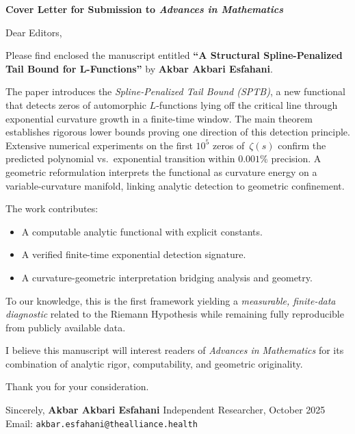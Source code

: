 
  

\begin{center}
\textbf{Cover Letter for Submission to \emph{Advances in Mathematics}}\\[6pt]
\end{center}

Dear Editors,

Please find enclosed the manuscript entitled
\textbf{“A Structural Spline-Penalized Tail Bound for L-Functions”}
by \textbf{Akbar Akbari Esfahani}.

The paper introduces the \emph{Spline-Penalized Tail Bound (SPTB)}, a new
functional that detects zeros of automorphic $L$-functions lying off the
critical line through exponential curvature growth in a finite-time window.
The main theorem establishes rigorous lower bounds proving one direction of
this detection principle.  Extensive numerical experiments on the first
$10^5$ zeros of~$\zeta(s)$ confirm the predicted polynomial vs.\ exponential
transition within \(0.001\%\) precision.  A geometric reformulation interprets
the functional as curvature energy on a variable-curvature manifold, linking
analytic detection to geometric confinement.

The work contributes:
  \begin{itemize}
\item A computable analytic functional with explicit constants.
\item A verified finite-time exponential detection signature.
\item A curvature-geometric interpretation bridging analysis and geometry.
\end{itemize}

To our knowledge, this is the first framework yielding a
\emph{measurable, finite-data diagnostic} related to the Riemann Hypothesis
while remaining fully reproducible from publicly available data.

I believe this manuscript will interest readers of
\emph{Advances in Mathematics} for its combination of analytic rigor,
computability, and geometric originality.

Thank you for your consideration.

Sincerely,  
\textbf{Akbar Akbari Esfahani}  
Independent Researcher, October 2025  
Email: \texttt{akbar.esfahani@thealliance.health}
